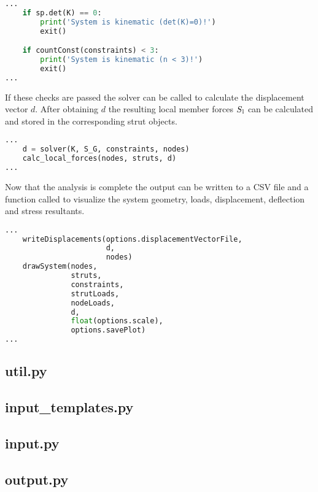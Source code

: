 \begin{lstlisting}[basicstyle=\small,language=python]
...
    if sp.det(K) == 0:
        print('System is kinematic (det(K)=0)!')
        exit()

    if countConst(constraints) < 3:
        print('System is kinematic (n < 3)!')
        exit()
...
\end{lstlisting}

If these checks are passed the solver can be called to calculate the displacement vector $d$.
After obtaining $d$ the resulting local member forces $S\textsubscript{l}$ can be calculated and stored in the corresponding strut objects.

\begin{lstlisting}[basicstyle=\small,language=python]
...
    d = solver(K, S_G, constraints, nodes)
    calc_local_forces(nodes, struts, d)
...
\end{lstlisting}

Now that the analysis is complete the output can be written to a CSV file and a function called to visualize the system geometry, loads, displacement, deflection and stress resultants.

\begin{lstlisting}[basicstyle=\small,language=python]
...
    writeDisplacements(options.displacementVectorFile,
                       d,
                       nodes)
    drawSystem(nodes,
               struts,
               constraints,
               strutLoads,
               nodeLoads,
               d,
               float(options.scale),
               options.savePlot)
...
\end{lstlisting}




\subsection{util.py}
\label{subsec:util.py}



\subsection{input\_templates.py}
\label{subsec:inputtemplates.py}


\subsection{input.py}
\label{subsec:input.py}


\subsection{output.py}
\label{subsec:output.py}


